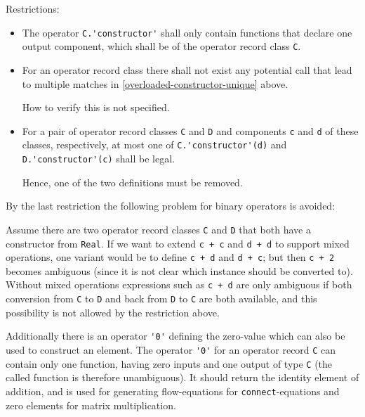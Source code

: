 Restrictions:
\begin{itemize}
\item
  The operator \lstinline!C.'constructor'! shall only contain functions that declare one output component, which shall be of the operator record class \lstinline!C!.
\item
  For an operator record class there shall not exist any potential call that lead to multiple matches in \cref{overloaded-constructor-unique} above.
  \begin{nonnormative}
  How to verify this is not specified.
  \end{nonnormative}
\item
  For a pair of operator record classes \lstinline!C! and \lstinline!D! and components \lstinline!c! and \lstinline!d! of these classes, respectively, at most one of \lstinline!C.'constructor'(d)! and \lstinline!D.'constructor'(c)! shall be legal.
  \begin{nonnormative}
   Hence, one of the two definitions must be removed.
  \end{nonnormative}
\end{itemize}

\begin{nonnormative}
By the last restriction the following problem for binary operators is avoided:

Assume there are two operator record classes \lstinline!C! and \lstinline!D! that both have a constructor from \lstinline!Real!.
If we want to extend \lstinline!c + c! and \lstinline!d + d! to support mixed operations, one variant would be to define \lstinline!c + d! and \lstinline!d + c!; but then \lstinline!c + 2! becomes ambiguous (since it is not clear which instance should be converted to).
Without mixed operations expressions such as \lstinline!c + d! are only ambiguous if both conversion from \lstinline!C! to \lstinline!D! and back from \lstinline!D! to \lstinline!C! are both available, and this possibility is not allowed by the restriction above.
\end{nonnormative}

Additionally there is an operator \lstinline!'0'! defining the zero-value which can also be used to construct an element.
The operator \lstinline!'0'! for an operator record \lstinline!C! can contain only one function, having zero inputs and one output of type \lstinline!C! (the called function is therefore unambiguous).
It should return the identity element of addition, and is used for generating flow-equations for \lstinline!connect!-equations and zero elements for matrix multiplication.

